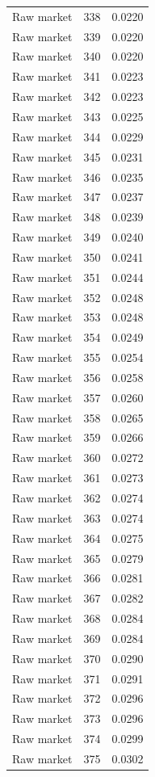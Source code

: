 \begin{table}[htbp]
\begin{tabular}{lll}
Raw market & 338 & 0.0220 \\
Raw market & 339 & 0.0220 \\
Raw market & 340 & 0.0220 \\
Raw market & 341 & 0.0223 \\
Raw market & 342 & 0.0223 \\
Raw market & 343 & 0.0225 \\
Raw market & 344 & 0.0229 \\
Raw market & 345 & 0.0231 \\
Raw market & 346 & 0.0235 \\
Raw market & 347 & 0.0237 \\
Raw market & 348 & 0.0239 \\
Raw market & 349 & 0.0240 \\
Raw market & 350 & 0.0241 \\
Raw market & 351 & 0.0244 \\
Raw market & 352 & 0.0248 \\
Raw market & 353 & 0.0248 \\
Raw market & 354 & 0.0249 \\
Raw market & 355 & 0.0254 \\
Raw market & 356 & 0.0258 \\
Raw market & 357 & 0.0260 \\
Raw market & 358 & 0.0265 \\
Raw market & 359 & 0.0266 \\
Raw market & 360 & 0.0272 \\
Raw market & 361 & 0.0273 \\
Raw market & 362 & 0.0274 \\
Raw market & 363 & 0.0274 \\
Raw market & 364 & 0.0275 \\
Raw market & 365 & 0.0279 \\
Raw market & 366 & 0.0281 \\
Raw market & 367 & 0.0282 \\
Raw market & 368 & 0.0284 \\
Raw market & 369 & 0.0284 \\
Raw market & 370 & 0.0290 \\
Raw market & 371 & 0.0291 \\
Raw market & 372 & 0.0296 \\
Raw market & 373 & 0.0296 \\
Raw market & 374 & 0.0299 \\
Raw market & 375 & 0.0302 \\

\end{tabular}
\end{table}
